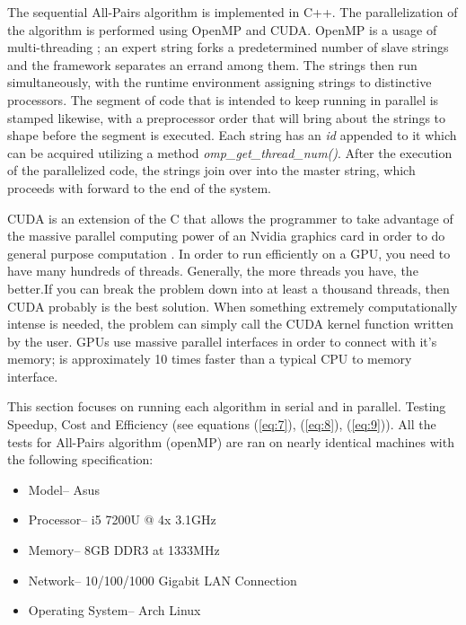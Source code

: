 \documentclass[letterpaper, 10 pt, conference]{ieeeconf}
\begin{document}
    The sequential All-Pairs algorithm is implemented in C++. The parallelization of the algorithm is performed using OpenMP and CUDA. OpenMP is a usage of multi-threading \cite{c11}; an expert string forks a predetermined number of slave strings and the framework separates an errand among them. The strings then run simultaneously, with the runtime environment assigning strings to distinctive processors. The segment of code that is intended to keep running in parallel is stamped likewise, with a preprocessor order that will bring about the strings to shape before the segment is executed. Each string has an \textit{id} appended to it which can be acquired utilizing a method \textit{omp\_get\_thread\_num()}. After the execution of the parallelized code, the strings join over into the master string, which proceeds with forward to the end of the system. \par

    CUDA is an extension of the C that allows the programmer to take advantage of the massive parallel computing power of an Nvidia graphics card in order to do general purpose computation \cite{c12}. In order to run efficiently on a GPU, you need to have many hundreds of threads. Generally, the more threads you have, the better.If you can break the problem down into at least a thousand threads, then CUDA probably is the best solution. When something extremely computationally intense is needed, the problem can simply call the CUDA kernel function written by the user. GPUs use massive parallel interfaces in order to connect with it’s memory; is approximately 10 times faster than a typical CPU to memory interface. \par

    This section focuses on running each algorithm in serial and in parallel. Testing Speedup, Cost and Efficiency (see equations (\ref{eq:7}), (\ref{eq:8}), (\ref{eq:9})). All the tests for All-Pairs algorithm (openMP) are ran on nearly identical machines with the following specification:
    \begin{itemize}
        \item Model{--} Asus
        \item Processor{--} i5 7200U @ 4x 3.1GHz
        \item Memory{--} 8GB DDR3 at 1333MHz
        \item Network{--} 10/100/1000 Gigabit LAN Connection
        \item Operating System{--} Arch Linux
    \end{itemize}
\end{document}
